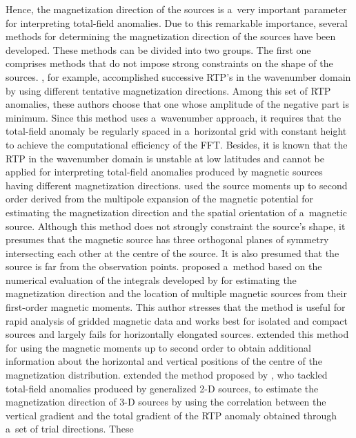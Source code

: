\documentclass[journal abbreviation, npg]{copernicus}
\begin{document}
Hence, the magnetization direction of the sources is a~very important
parameter for interpreting total-field anomalies. Due to this remarkable
importance, several methods for determining the magnetization direction of
the sources have been developed. These methods can be divided into two
groups. The first one comprises methods that do not impose strong constraints
on the shape of the sources. \citet{fedi-etal1994}, for example, accomplished
successive RTP's in the wavenumber domain by using different tentative
magnetization directions. Among this set of RTP anomalies, these authors
choose that one whose amplitude of the negative part is minimum. Since this
method uses a~wavenumber approach, it requires that the total-field anomaly
be regularly spaced in a~horizontal grid with constant height to achieve the
computational efficiency of the FFT. Besides, it is known that the RTP in the
wavenumber domain is unstable at low latitudes and cannot be applied for
interpreting total-field anomalies produced by magnetic sources having
different magnetization directions. \citet{medeiros-silva1995} used the
source moments up to second order derived from the multipole expansion of the
magnetic potential for estimating the magnetization direction and the spatial
orientation of a~magnetic source. Although this method does not strongly
constraint the source's shape, it presumes that the magnetic source has three
orthogonal planes of symmetry intersecting each other at the centre of the
source. It is also presumed that the source is far from the observation
points. \citet{phillips2005} proposed a~method based on the numerical
evaluation of the integrals developed by \citet{helbig1963} for estimating
the magnetization direction and the location of multiple magnetic sources
from their first-order magnetic moments. This author stresses that the method
is useful for rapid analysis of gridded magnetic data and works best for
isolated and compact sources and largely fails for horizontally elongated
sources. \citet{tontini-pedersen2008} extended this method for using the
magnetic moments up to second order to obtain additional information about
the horizontal and vertical positions of the centre of the magnetization
distribution. \citet{dannemiller-li2006} extended the method proposed by
\citet{roest-pilkington1993}, who tackled total-field anomalies produced by
generalized 2-D sources, to estimate the magnetization direction of 3-D
sources by using the correlation between the vertical gradient and the total
gradient of the RTP anomaly obtained through a~set of trial directions. These
\end{document}
